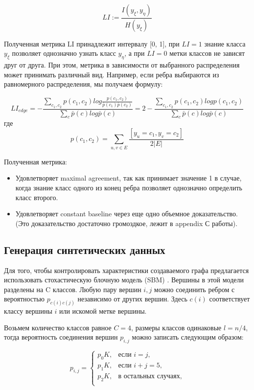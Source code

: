 \documentclass[a4paper,14pt]{article}
\begin{document}
	$$ LI := \frac{I( y_{\xi}, y_{\eta} )}{H(y_{\xi})} $$
	
	Полученная метрика LI принадлежит интервалу [0, 1], при $ LI = 1 $ знание класса $ y_{\xi} $ позволяет однозначно узнать класс $ y_{\eta} $, а при $ LI = 0 $ метки классов не зависят друг от друга.
	При этом, метрика в зависимости от выбранного распределения может принимать различный вид. Например, если ребра выбираются из равномерного распределения, мы получаем формулу:
	
	$$ LI_{edge} = - \frac{ \sum_{c_1, c_2} p(c_1, c_2) log \frac{ p(c_1, c_2) }{ \bar{p}(c_1) \bar{p}(c_2) } }{ \sum_c \bar{p}(c) log \bar{p}(c) } = 2 - \frac{  \sum_{c_1, c_2} p(c_1, c_2)  log p(c_1, c_2) }{ \sum_c \bar{p}(c) log \bar{p}(c) } $$
	где $$ p(c_1, c_2) = \sum_{u, v \in E} \frac{ [y_u = c_1, y_v = c_2] }{ 2|E| } $$
	
	Полученная метрика:
	\begin{itemize}
		\item Удовлетворяет maximal agreement, так как принимает значение 1 в случае, когда знание класс одного из конец ребра позволяет однозначно определить класс второго.
		
		\item Удовлетворяет constant baseline через еще одно объемное доказательство. (Это доказательство достаточно громоздкое, лежит в appendix С работы).
	\end{itemize}
	
	\subsection{Генерация синтетических данных}
	
	Для того, чтобы контролировать характеристики создаваемого графа предлагается использовать стохастическую блочную модель (SBM) \cite{holland1983stochastic}.
	Вершины в этой модели разделены на C классов.
	Любую пару вершин $i,j$ можно соединить ребром с вероятностью $p_{c(i)c(j)}$  независимо от других вершин.
	Здесь $c(i)$ соответствует классу вершины $i$ или искомой метке вершины.
	
	Возьмем  количество классов равное $C=4$, размеры классов одинаковые $l=n/4$, тогда вероятность соединения вершин $p_{i,j}$ можно записать следующим образом:
	
	$$p_{i,j} = \begin{cases}
		p_0K, & \text{если } i = j,\\
		p_1K, & \text{если } i + j = 5,\\
		p_2K, & \text{в остальных случаях},\\
	\end{cases}$$
	
\end{document}
